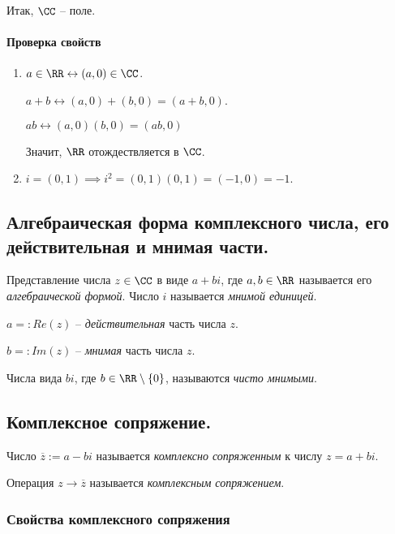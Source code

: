 Итак, $\CC$ -- поле.

\paragraph{Проверка свойств}
\begin{enumerate}
\item $a \in \RR \leftrightarrow (a, 0) \in \CC$.

    $a + b \leftrightarrow (a, 0) + (b, 0) = (a + b, 0)$.

    $ab \leftrightarrow (a, 0)(b, 0) = (ab, 0)$

    Значит, $\RR$ отождествляется в $\CC$.

\item
    $i = (0, 1) \implies i^2 = (0, 1)(0, 1) = (-1, 0) = -1$.
\end{enumerate}


\subsection{Алгебраическая форма комплексного числа, его действительная и мнимая части.}

\begin{definition}
    Представление числа $z \in \CC$ в виде $a + bi$, где $a, b \in \RR$ называется его \textit{алгебраической формой}.
    Число $i$ называется \textit{мнимой единицей}.

    $a =: Re(z)$ -- \textit{действительная} часть числа $z$.

    $b =: Im(z)$ -- \textit{мнимая} часть числа $z$.
\end{definition}

Числа вида $bi$, где $b \in \RR \setminus \{0\}$, называются \textit{чисто мнимыми}.

\subsection{Комплексное сопряжение.}

\begin{definition}
    Число $\overline{z} := a - bi$ называется \textit{комплексно сопряженным} к числу $z = a + bi$.

    Операция $z \to \overline{z}$ называется \textit{комплексным сопряжением}.
\end{definition}

\subsubsection{Свойства комплексного сопряжения}

